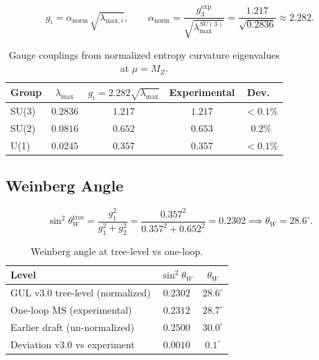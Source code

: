 \documentclass[11pt]{article}
\begin{document}
\begin{equation}
  \boxed{
    g_i = \alpha_\text{norm}\,\sqrt{\lambda_{\text{max},i}},
    \qquad
    \alpha_\text{norm}
    = \frac{g_3^\text{exp}}{\sqrt{\lambda_\text{max}^{SU(3)}}}
    = \frac{1.217}{\sqrt{0.2836}}
    \approx 2.282.
  }
\end{equation}

\begin{table}[htbp]
\centering
\caption{Gauge couplings from normalized entropy curvature
eigenvalues at $\mu=M_Z$.}
\label{tab:couplings}
\begin{tabular}{@{}lcccc@{}}
\toprule
Group & $\lambda_\text{max}$ & $g_i=2.282\sqrt{\lambda_\text{max}}$
  & Experimental & Dev.\ \\
\midrule
SU(3) & $0.2836$ & $1.217$ & $1.217$ & ${<}0.1\%$ \\
SU(2) & $0.0816$ & $0.652$ & $0.653$ & $0.2\%$ \\
U(1)  & $0.0245$ & $0.357$ & $0.357$ & ${<}0.1\%$ \\
\bottomrule
\end{tabular}
\end{table}

\subsection{Weinberg Angle}

\begin{equation}
  \sin^2\theta_W^\text{tree}
  = \frac{g_1^2}{g_1^2+g_2^2}
  = \frac{0.357^2}{0.357^2+0.652^2}
  = 0.2302
  \implies \theta_W = 28.6^\circ.
\end{equation}

\begin{table}[htbp]
\centering
\caption{Weinberg angle at tree-level vs one-loop.}
\label{tab:weinberg}
\begin{tabular}{@{}lcc@{}}
\toprule
Level & $\sin^2\theta_W$ & $\theta_W$ \\
\midrule
GUL v3.0 tree-level (normalized) & $0.2302$ & $28.6^\circ$ \\
One-loop $\overline{\mathrm{MS}}$ (experimental) & $0.2312$ & $28.7^\circ$ \\
Earlier draft (un-normalized) & $0.2500$ & $30.0^\circ$ \\
\midrule
Deviation v3.0 vs experiment & $0.0010$ & $0.1^\circ$ \\
\bottomrule
\end{tabular}
\end{table}
\end{document}
